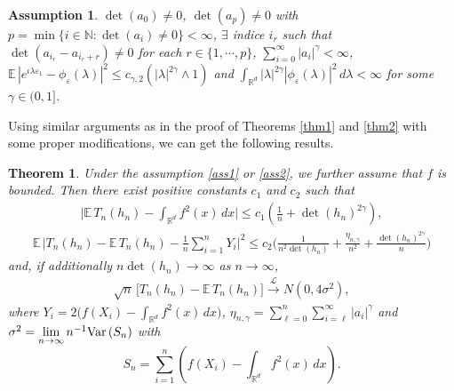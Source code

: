 \documentclass[11pt]{article}
\newtheorem {theorem}{Theorem}[section]
\newtheorem{assumption}{Assumption}
\def\R{{\mathbb R}}
\def\E{{{\mathbb E}\,}}
\def\N{{\mathbb N}}
\def\Var{{\mathop {{\rm Var\, }}}}
\begin{document}
\begin{assumption} \label{ass3}
$\det(a_0)\neq 0$, $\det(a_p)\neq 0$ with $p=\min\{i\in\N: \det(a_i)\neq 0\}<\infty$, $\exists$ indice $i_r$ such that $\det(a_{i_r}-a_{i_r+r})\neq 0$ for each $r\in\{1,\cdots, p\}$, $\sum\limits^{\infty}_{i=0} |a_i|^{\gamma}<\infty$, $\E|e^{\iota \lambda \varepsilon_1}-\phi_{\varepsilon}(\lambda)|^{2}\leq c_{\gamma,2} \left(|\lambda|^{2\gamma}\wedge 1\right)$ and $\int_{\R^d}|\lambda|^{2\gamma} |\phi_{\varepsilon}(\lambda)|^2\, d\lambda<\infty$ for some $\gamma\in(0,1]$.
\end{assumption}

Using similar arguments as in the proof of Theorems \ref{thm1} and \ref{thm2} with some proper modifications, we can get the following results.

\begin{theorem} \label{thm5}  Under the assumption \ref{ass1} or \ref{ass2}, we further assume that $f$ is bounded. Then there exist positive constants $c_1$ and $c_2$ such that
\begin{align} \label{r71}
\Big|\E T_n(h_n)-\int_{\R^d} f^2(x)\, dx \Big|\leq c_1\left(\frac{1}{n}+\det(h_n)^{2\gamma}\right),
\end{align}
\begin{align}  \label{r72}
\E\Big|T_n(h_n)-\E T_n(h_n)-\frac{1}{n}\sum^n_{i=1}Y_i\Big|^2 \leq c_2 \Big(\frac{1}{n^2\det(h_n)}+\frac{\eta_{n,\gamma}}{n^2}+\frac{\det(h_n)^{2\gamma}}{n}\Big)
\end{align}
and, if additionally $n\det(h_n)\to \infty$ as $n\to\infty$,
\begin{align} \label{r73}
\sqrt{n}\, \Big[T_n(h_n)-\E T_n(h_n)\Big]\overset{\mathcal{L}}{\longrightarrow} N(0,4\sigma^2),
\end{align}
where $Y_i=2\big(f(X_i)-\int_{\R^d} f^2(x)\, dx\big)$, $\eta_{n,\gamma}=\sum\limits^{n}_{\ell=0}\sum\limits^{\infty}_{i=\ell} |a_i|^{\gamma}$
and $\sigma^2=\lim\limits_{n\to\infty} n^{-1}\Var(S_n)$ with 
\[
S_n=\sum\limits^n_{i=1}\left(f(X_i)-\int_{\R^d} f^2(x)\, dx\right).
\]
\end{theorem}

\bigskip
\end{document}
